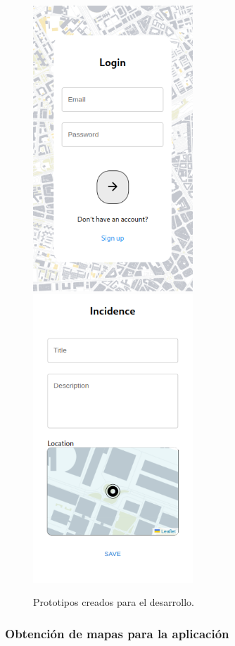 \documentclass{article}
\begin{document}
\begin{figure}[H]
    \center
    \includegraphics[width=6cm]{images/login.png}
    \includegraphics[width=6cm]{images/crear_incidencia.png}
    \caption{Prototipos creados para el desarrollo.}
    \label{fig:prototipos-creados}
\end{figure}

\subsubsection{Obtención de mapas para la aplicación}
\end{document}
